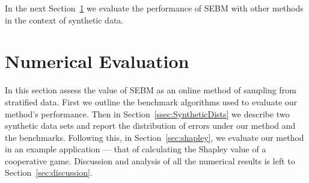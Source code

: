 





In the next Section~\ref{sec:application} we evaluate the performance of SEBM with other methods in the context of synthetic data.


\pagebreak
\section{Numerical Evaluation}\label{sec:application}

In this section assess the value of SEBM as an online method of sampling from stratified data.
First we outline the benchmark algorithms used to evaluate our method's performance.
Then in Section~\ref{ssec:SyntheticDists}
we describe two synthetic data sets and report the distribution of errors under our method and the benchmarks.
Following this, in Section~\ref{sec:shapley}, we evaluate our method in an example application --- that of calculating the Shapley value of a cooperative game.
Discussion and analysis of all the numerical results is left to Section~\ref{sec:discussion}.




